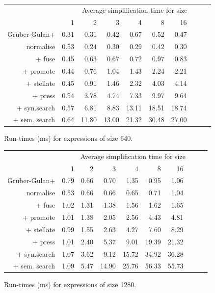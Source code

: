 \begin{figure}\begin{tabular}{rrrrrrrrrr}
 & \multicolumn{9}{c}{Average simplification time for size} \\
 & 1 & 2 & 3 & 4 & 8 & 16 \\
Gruber-Gulan+ & 0.31 & 0.31 & 0.42 & 0.67 & 0.52 & 0.47 \\
normalise & 0.53 & 0.24 & 0.30 & 0.29 & 0.42 & 0.30 \\
+ fuse & 0.45 & 0.63 & 0.67 & 0.72 & 0.97 & 0.83 \\
+ promote & 0.44 & 0.76 & 1.04 & 1.43 & 2.24 & 2.21 \\
+ stellate & 0.45 & 0.91 & 1.46 & 2.32 & 4.03 & 4.14 \\
+ press & 0.54 & 3.78 & 4.74 & 7.33 & 9.97 & 9.64 \\
+ syn.search & 0.57 & 6.81 & 8.83 & 13.11 & 18.51 & 18.74 \\
+ sem. search & 0.64 & 11.80 & 13.00 & 21.32 & 30.48 & 27.00 \\
\end{tabular}\caption{Run-times (ms) for expressions of size 640.}\end{figure}
\begin{figure}\begin{tabular}{rrrrrrrrrr}
 & \multicolumn{9}{c}{Average simplification time for size} \\
 & 1 & 2 & 3 & 4 & 8 & 16 \\
Gruber-Gulan+ & 0.79 & 0.66 & 0.70 & 1.35 & 0.95 & 1.06 \\
normalise & 0.53 & 0.66 & 0.66 & 0.65 & 0.71 & 1.04 \\
+ fuse & 1.02 & 1.31 & 1.38 & 1.56 & 1.62 & 1.65 \\
+ promote & 1.01 & 1.38 & 2.05 & 2.56 & 4.43 & 4.81 \\
+ stellate & 0.99 & 1.55 & 2.63 & 4.27 & 7.60 & 8.29 \\
+ press & 1.01 & 2.40 & 5.37 & 9.01 & 19.39 & 21.32 \\
+ syn.search & 1.07 & 3.62 & 9.12 & 15.72 & 34.92 & 36.28 \\
+ sem. search & 1.09 & 5.47 & 14.90 & 25.76 & 56.33 & 55.73 \\
\end{tabular}\caption{Run-times (ms) for expressions of size 1280.}\end{figure}
